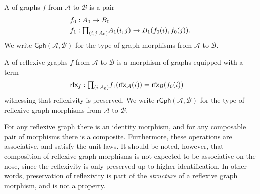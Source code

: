 \begin{defn}
A  of graphs $f$ from $\mathcal{A}$ to $\mathcal{B}$ is a pair
\begin{align*}
\pts{f} & : \pts{A} \to \pts{B} \\
\edg{f} & : \prd{i,j:\pts{A}} \edg{A}(i,j)\to \edg{B}(\pts{f}(i),\pts{f}(j)).
\end{align*}
We write $\mathsf{Gph}(\mathcal{A},\mathcal{B})$ for the type of graph morphisms from $\mathcal{A}$ to $\mathcal{B}$.

A  of reflexive graphs $f$ from $\mathcal{A}$ to $\mathcal{B}$ is a morphism of graphs equipped with a term
\begin{align*}
\rfx{f} & : \prd{i:\pts{A}} \edg{f}(\rfx{\mathcal{A}}(i))= \rfx{\mathcal{B}}(\pts{f}(i))
\end{align*}
witnessing that reflexivity is preserved. We write $\mathsf{rGph}(\mathcal{A},\mathcal{B})$ for the type of reflexive graph morphisms from $\mathcal{A}$ to $\mathcal{B}$.
\end{defn}

For any reflexive graph there is an identity morphism, and for any composable pair of morphisms there is a composite. Furthermore, these operations are associative, and satisfy the unit laws. It should be noted, however, that composition of reflexive graph morphisms is not expected to be associative on the nose, since the reflexivity is only preserved up to higher identification. In other words, preservation of reflexivity is part of the \emph{structure} of a reflexive graph morphism, and is not a property. 

